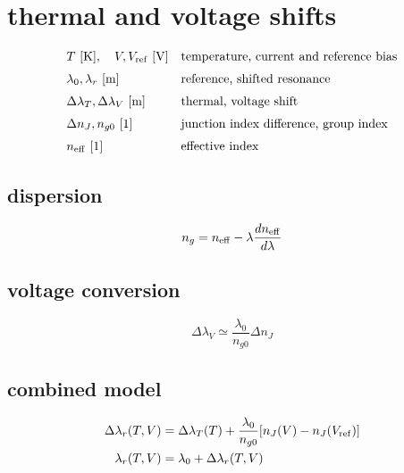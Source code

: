 \section*{thermal and voltage shifts}
\[
\begin{array}{ll}T\ [\mathrm K],\quad V,V_{\rm ref}\ [\mathrm V]&\text{temperature, current and reference bias}\\[0.6em]\lambda_0,\lambda_r\ [\mathrm m]&\text{reference, shifted resonance}\\[0.6em]\Delta\lambda_T,\Delta\lambda_V\ [\mathrm m]&\text{thermal, voltage shift}\\[0.6em]\Delta n_J,n_{g0}\ [1]&\text{junction index difference, group index}\\[0.6em]n_{\rm eff}\ [1]&\text{effective index}\end{array}
\]
\subsection*{dispersion}
\[
\displaystyle n_g=n_{\rm eff}-\lambda\frac{dn_{\rm eff}}{d\lambda}
\]
\subsection*{voltage conversion}
\[
\displaystyle \Delta\lambda_V\simeq\frac{\lambda_0}{n_{g0}}\Delta n_J
\]
\subsection*{combined model}
\[
\displaystyle \begin{aligned}\Delta\lambda_r(T,V)&=\Delta\lambda_T(T)+\frac{\lambda_0}{n_{g0}}[n_J(V)-n_J(V_{\rm ref})]\\\lambda_r(T,V)&=\lambda_0+\Delta\lambda_r(T,V)\end{aligned}
\]
